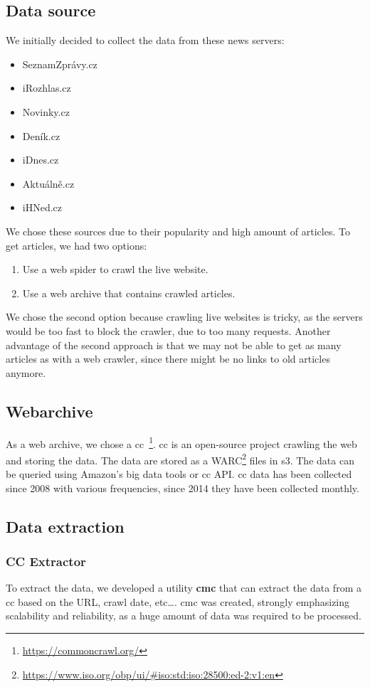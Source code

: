 \subsection{Data source}
We initially decided to collect the data from these news servers:
\begin{itemize}
    \item SeznamZprávy.cz
    \item iRozhlas.cz
    \item Novinky.cz
    \item Deník.cz
    \item iDnes.cz
    \item Aktuálně.cz
    \item iHNed.cz
\end{itemize}
We chose these sources due to their popularity and high amount of articles.
To get articles, we had two options:
\begin{enumerate}
    \item Use a web spider to crawl the live website.
    \item Use a web archive that contains crawled articles.
\end{enumerate}
We chose the second option because crawling live websites is tricky,
as the servers would be too fast to block the crawler, due to too many requests. Another advantage of the second approach is that we may not be able to get as many articles as
with a web crawler, since there might be no links to old articles anymore.

\subsection{Webarchive}
As a web archive, we chose a \ac{cc}~\footnote{\url{https://commoncrawl.org/}}.
\ac{cc} is an open-source project crawling the web and storing the data.
The data are stored as a WARC\footnote{\url{https://www.iso.org/obp/ui/\#iso:std:iso:28500:ed-2:v1:en}} files in \ac{s3}.
The data can be queried using Amazon's big data tools or \ac{cc} API.
\ac{cc} data has been collected since 2008 with various frequencies,
since 2014 they have been collected monthly.

\subsection{Data extraction}
\subsubsection{CC Extractor}
To extract the data, we developed a utility \textbf{\ac{cmc}} that can extract the data from a \ac{cc}
based on the URL, crawl date, etc\dots. \ac{cmc} was
created, strongly emphasizing scalability and reliability, as a huge amount of data
was required to be processed.

